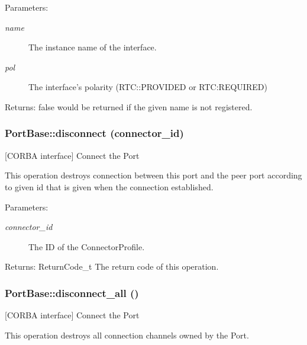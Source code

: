 \begin{Desc}
\item[Parameters:]
\begin{description}
\item[{\em name}]The instance name of the interface. \item[{\em pol}]The interface's polarity (RTC::PROVIDED or RTC:REQUIRED) \end{description}
\end{Desc}
\begin{Desc}
\item[Returns:]false would be returned if the given name is not registered.\end{Desc}
\subsubsection{\setlength{\rightskip}{0pt plus 5cm}Port\-Base::disconnect (connector\_\-id)}\label{classPortBase_PortBasea7}


[CORBA interface] Connect the Port 

This operation destroys connection between this port and the peer port according to given id that is given when the connection established.

\begin{Desc}
\item[Parameters:]
\begin{description}
\item[{\em connector\_\-id}]The ID of the Connector\-Profile. \end{description}
\end{Desc}
\begin{Desc}
\item[Returns:]Return\-Code\_\-t The return code of this operation.\end{Desc}
\subsubsection{\setlength{\rightskip}{0pt plus 5cm}Port\-Base::disconnect\_\-all ()}\label{classPortBase_PortBasea9}


[CORBA interface] Connect the Port 

This operation destroys all connection channels owned by the Port.

